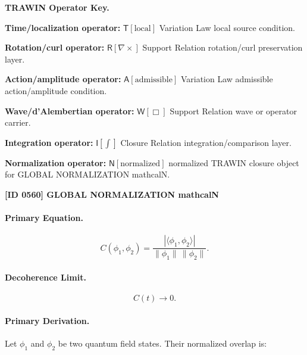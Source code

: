 \par\vspace{0.45\baselineskip}
\noindent\begin{minipage}[t]{\linewidth}
\begingroup
\small
\raggedright
\textbf{TRAWIN Operator Key.}\par
\noindent\textbf{Time/localization operator:} $\mathsf{T}\!\left[\mathrm{local}\right]$ Variation Law local source condition.\par
\noindent\textbf{Rotation/curl operator:} $\mathsf{R}\!\left[\nabla\times\right]$ Support Relation rotation/curl preservation layer.\par
\noindent\textbf{Action/amplitude operator:} $\mathsf{A}\!\left[\mathrm{admissible}\right]$ Variation Law admissible action/amplitude condition.\par
\noindent\textbf{Wave/d'Alembertian operator:} $\mathsf{W}\!\left[\Box\right]$ Support Relation wave or operator carrier.\par
\noindent\textbf{Integration operator:} $\mathsf{I}\!\left[\int\right]$ Closure Relation integration/comparison layer.\par
\noindent\textbf{Normalization operator:} $\mathsf{N}\!\left[\mathrm{normalized}\right]$ normalized TRAWIN closure object for GLOBAL NORMALIZATION mathcalN.\par
\endgroup
\end{minipage}

\clearpage
\noindent\textbf{[ID 0560] GLOBAL NORMALIZATION mathcalN}\par
\vspace{0.35em}
\paragraph{Primary Equation.}
\begin{equation}
C(\phi_1,\phi_2)
=
\frac{
|\langle \phi_1,\phi_2\rangle|
}{
\|\phi_1\|\,\|\phi_2\|
}.
\end{equation}

\paragraph{Decoherence Limit.}
\begin{equation}
C(t)\rightarrow 0 .
\end{equation}

\paragraph{Primary Derivation.}
Let $\phi_1$ and $\phi_2$ be two quantum field states.  
Their normalized overlap is:

